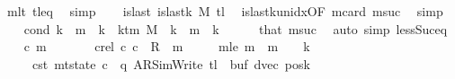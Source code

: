 \begin{isabellebody}
\ m{}lt\ tl{\isacharunderscore}{\kern0pt}eq\ \isamarkupfalse%
\ simp\isanewline
\ \ \isamarkupfalse%
\ islast{\isacharcolon}{\kern0pt}\ {\isachardoublequoteopen}is{\isacharunderscore}{\kern0pt}last{\isacharunderscore}{\kern0pt}k\ M\ {\isacharquery}{\kern0pt}tl{\isachardoublequoteclose}\ \isamarkupfalse%
\ is{\isacharunderscore}{\kern0pt}last{\isacharunderscore}{\kern0pt}k{\isacharunderscore}{\kern0pt}unidx{\isacharbrackleft}{\kern0pt}OF\ m{}card{\isacharbrackright}{\kern0pt}\ m{}suc\ \isamarkupfalse%
\ simp\isanewline
\ \ \isamarkupfalse%
\ cond{\isacharcolon}{\kern0pt}\ {\isachardoublequoteopen}{\isacharparenleft}{\kern0pt}k\ {\isacharless}{\kern0pt}\ {\isacharquery}{\kern0pt}m{}{\isacharparenright}{\kern0pt}\ {\isacharequal}{\kern0pt}\ {\isacharparenleft}{\kern0pt}k\ {\isacharless}{\kern0pt}\ k{\isacharunderscore}{\kern0pt}tm\ M{\isacharparenright}{\kern0pt}{\isachardoublequoteclose}\ \ {\isachardoublequoteopen}k\ {\isasymnoteq}\ {\isacharquery}{\kern0pt}m{}{\isachardoublequoteclose}\ \ k\isanewline
\ \ \ \ \isamarkupfalse%
\ that\ m{}suc\ \isamarkupfalse%
\ {\isacharparenleft}{\kern0pt}auto\ simp{\isacharcolon}{\kern0pt}\ less{\isacharunderscore}{\kern0pt}Suc{\isacharunderscore}{\kern0pt}eq{\isacharparenright}{\kern0pt}\isanewline
\ \ \isamarkupfalse%
\ c{}\ m{}\ \isanewline
\ \ \ \ \ \ c{}{\isacharunderscore}{\kern0pt}rel{\isacharcolon}{\kern0pt}\ {\isachardoublequoteopen}{\isacharparenleft}{\kern0pt}c{}{\isacharcomma}{\kern0pt}\ c{}{\isacharparenright}{\kern0pt}\ {\isasymin}\ R{\isacharprime}{\kern0pt}\ {\isacharcircum}{\kern0pt}{\isacharcircum}{\kern0pt}\ m{}{\isachardoublequoteclose}\isanewline
\ \ \ \ \ m{}{\isacharunderscore}{\kern0pt}le{\isacharcolon}{\kern0pt}\ {\isachardoublequoteopen}m{}\ {\isasymle}\ {\isacharquery}{\kern0pt}m{}\ {\isacharasterisk}{\kern0pt}\ {\isacharparenleft}{\kern0pt}{}\ {\isacharasterisk}{\kern0pt}\ {\isacharquery}{\kern0pt}k{\isacharparenright}{\kern0pt}{\isachardoublequoteclose}\isanewline
\ \ \ \ \ c{}{\isacharunderscore}{\kern0pt}st{\isacharcolon}{\kern0pt}\ {\isachardoublequoteopen}mt{\isacharunderscore}{\kern0pt}state\ c{}\ {\isacharequal}{\kern0pt}\ {\isacharparenleft}{\kern0pt}q{\isacharcomma}{\kern0pt}\ AR{\isacharunderscore}{\kern0pt}SimWrite{\isacharcomma}{\kern0pt}\ {\isacharquery}{\kern0pt}tl{\isacharcomma}{\kern0pt}\ {}{\isacharcomma}{\kern0pt}\ buf{\isacharcomma}{\kern0pt}\ dvec{\isacharcomma}{\kern0pt}\ posk{\isacharparenright}{\kern0pt}{\isachardoublequoteclose}\isanewline

\end{isabellebody}
